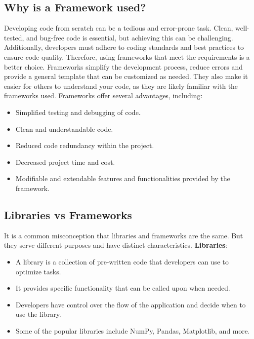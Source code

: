 \subsection{Why is a Framework used?}
Developing code from scratch can be a tedious and error-prone task. Clean, well-tested, and bug-free code is essential, but achieving this can be challenging.
Additionally, developers must adhere to coding standards and best practices to ensure code quality. Therefore, using frameworks that meet the requirements is
a better choice. Frameworks simplify the development process, reduce errors and provide a general template that can be customized as needed. They also make it
easier for others to understand your code, as they are likely familiar with the frameworks used. Frameworks offer several advantages, including:
\begin{itemize}
    \item Simplified testing and debugging of code.
    \item Clean and understandable code.
    \item Reduced code redundancy within the project.
    \item Decreased project time and cost.
    \item Modifiable and extendable features and functionalities provided by the framework.
\end{itemize}

\subsection{Libraries vs Frameworks}It is a common misconception that libraries and frameworks are the same. But they serve different purposes and have distinct characteristics. \newline \newline
\textbf{Libraries}:
\begin{itemize}
    \item A library is a collection of pre-written code that developers can use to optimize tasks.
    \item It provides specific functionality that can be called upon when needed.
    \item Developers have control over the flow of the application and decide when to use the library.
    \item Some of the popular libraries include NumPy, Pandas, Matplotlib, and more.\newline
\end{itemize}


